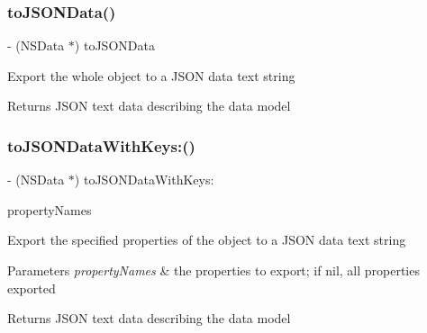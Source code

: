 \subsubsection{\texorpdfstring{to\+J\+S\+O\+N\+Data()}{toJSONData()}}
{\footnotesize\ttfamily -\/ (N\+S\+Data $\ast$) to\+J\+S\+O\+N\+Data \begin{DoxyParamCaption}{ }\end{DoxyParamCaption}}

Export the whole object to a J\+S\+ON data text string \begin{DoxyReturn}{Returns}
J\+S\+ON text data describing the data model 
\end{DoxyReturn}
\mbox{\label{interface_o_p_t_l_y_j_s_o_n_model_a55de253c412617cfd23a55b064571e13}} 
\subsubsection{\texorpdfstring{to\+J\+S\+O\+N\+Data\+With\+Keys\+:()}{toJSONDataWithKeys:()}}
{\footnotesize\ttfamily -\/ (N\+S\+Data $\ast$) to\+J\+S\+O\+N\+Data\+With\+Keys\+: \begin{DoxyParamCaption}\item[{(N\+S\+Array $\ast$)}]{property\+Names }\end{DoxyParamCaption}}

Export the specified properties of the object to a J\+S\+ON data text string 
\begin{DoxyParams}{Parameters}
{\em property\+Names} & the properties to export; if nil, all properties exported \\
\hline
\end{DoxyParams}
\begin{DoxyReturn}{Returns}
J\+S\+ON text data describing the data model 
\end{DoxyReturn}
\mbox{\label{interface_o_p_t_l_y_j_s_o_n_model_a0c49b24832149f756d011e17225cb5b1}} 
